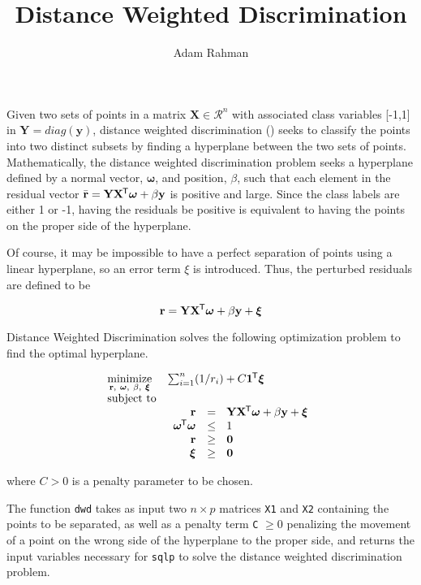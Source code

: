 \documentclass{article}
\author{Adam Rahman}
\title{Distance Weighted Discrimination}
\newcommand{\ve}[1]{\mathbf{#1}}           %
\newcommand{\sv}[1]{\boldsymbol{#1}}   %
\newcommand{\m}[1]{\mathbf{#1}}               %
\newcommand{\tr}[1]{{#1}^{\mkern-1.5mu\mathsf{T}}}              %
\begin{document}
\maketitle

Given two sets of points in a matrix $\m{X} \in \mathcal{R}^{n}$ with associated class variables [-1,1] in $\m{Y} = diag(\ve{y})$, distance weighted discrimination (\cite{marron2007distance}) seeks to classify the points into two distinct subsets by finding a hyperplane between the two sets of points. Mathematically, the distance weighted discrimination problem seeks a hyperplane defined by a normal vector, $\sv{\omega}$, and position, $\beta$, such that each element in the residual vector $\bar{\ve{r}} = \m{Y}\tr{\m{X}}\sv{\omega} + \beta \ve{y}$ is positive and large. Since the class labels are either 1 or -1, having the residuals be positive is equivalent to having the points on the proper side of the hyperplane.

Of course, it may be impossible to have a perfect separation of points using a linear hyperplane, so an error term $\xi$ is introduced. Thus, the perturbed residuals are defined to be

\[
\ve{r} =  \m{Y}\tr{\m{X}}\sv{\omega} + \beta \ve{y} + \sv{\xi}
\]

Distance Weighted Discrimination solves the following optimization problem to find the optimal hyperplane\cite{marron2007distance}.

\[
\begin{array}{ll}
\underset{\ve{r},~\sv{\omega},~\beta,~\sv{\xi}}{\text{minimize}} & \sum_{i=1}^{n}(1/r_{i}) + C\tr{\ve{1}}\sv{\xi} \\
\text{subject to} & \\
& \begin{array}{rl}
\ve{r} &=~~ \m{Y}\tr{\m{X}}\sv{\omega} + \beta \ve{y} + \sv{\xi} \\
\tr{\sv{\omega}}\sv{\omega} &\leq~~ 1 \\
\ve{r} &\geq~~ \ve{0} \\
\sv{\xi} &\geq~~ \ve{0}
\end{array}
\end{array}
\]

\noindent where $C > 0$ is a penalty parameter to be chosen. 

The function \verb!dwd! takes as input two $n \times p$ matrices \verb!X1! and \verb!X2! containing the points to be separated, as well as a penalty term \verb!C! $\geq 0$ penalizing the movement of a point on the wrong side of the hyperplane to the proper side, and returns the input variables necessary for \verb!sqlp! to solve the distance weighted discrimination problem. 
\end{document}
